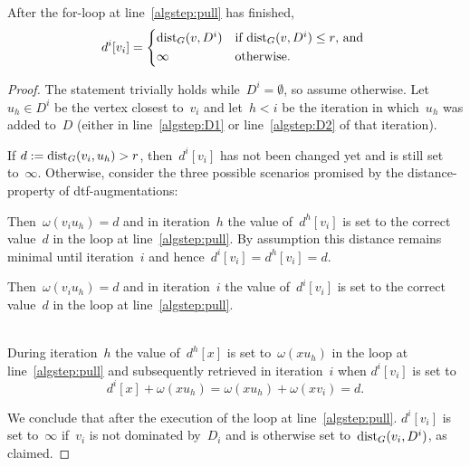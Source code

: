 \begin{lemma}
  After the for-loop at line~\ref{algstep:pull} has finished,
  \[
    d^i[v_i] = \begin{cases*}
      \dist_G(v,D^i) & if $\dist_G(v,D^i) \leq r$, and \\
      \infty & otherwise.
    \end{cases*}
  \]
\end{lemma}
\begin{proof}
  The statement trivially holds while~$D^i = \emptyset$, so assume otherwise.
  Let~$u_h \in D^i$ be the vertex closest to~$v_i$ and let~$h < i$
  be the iteration in which~$u_h$ was added to~$D$ (either in
  line~\ref{algstep:D1} or line~\ref{algstep:D2} of that iteration).

  If $d := \text{dist}_G(v_i,u_h) > r$,
  then~$d^i[v_i]$ has not been changed yet and is still set to~$\infty$.
  Otherwise, consider the three possible scenarios promised by the
  distance-property of dtf-augmentations:

  \begin{case}[$v_iu_h \in \dir G_d$]
    Then~$\omega(v_iu_h) = d$ and in iteration~$h$
    the value of~$d^h[v_i]$ is set to the correct value~$d$
    in the loop at line~\ref{algstep:pull}.
    By assumption this distance remains minimal until iteration~$i$
    and hence~$d^i[v_i] = d^h[v_i] = d$.
  \end{case}

  \begin{case}[$u_hv_i \in \dir G_d$]
    Then~$\omega(v_iu_h) = d$ and in iteration~$i$
    the value of~$d^i[v_i]$ is set to the correct value~$d$
    in the loop at line~\ref{algstep:pull}.
  \end{case}

  \def\ww#1{\omega(#1)}
  \begin{case}[$xu_h,xv_i \in \dir G_d$  with~$\ww{xu_h} + \ww{xv_i} = d$]\mbox{}\\
    During iteration~$h$ the value of~$d^h[x]$ is set to~$\ww{xu_h}$
    in the loop at line~\ref{algstep:pull} and subsequently retrieved
    in iteration~$i$ when $d^i[v_i]$ is set to
    \[
      d^i[x] + \ww{xu_h} = \ww{xu_h} + \ww{xv_i} = d.
    \]
    \vspace*{-1.5em}
  \end{case}
  \noindent
  We conclude that after the execution of the loop at line~\ref{algstep:pull}.
  $d^i[v_i]$ is set to~$\infty$ if~$v_i$ is not dominated by~$D_i$ and is
  otherwise set to~$\text{dist}_G(v_i,D^i)$, as claimed.
\end{proof}

